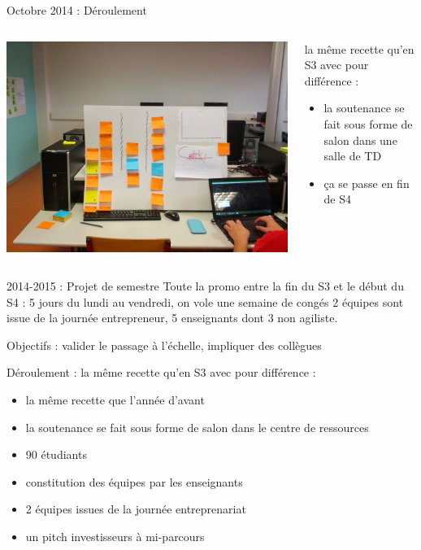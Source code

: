 \documentclass{beamer}
\begin{document}
\begin{frame}{Octobre 2014 : Déroulement }
  \begin{columns}
    \begin{column}{0.5\textwidth}
      \begin{center}
        \includegraphics[width=\textwidth]{includes/2014_S4_dashboard.jpg}      
      \end{center}
    \end{column}
    \begin{column}{0.5\textwidth}
      la même recette qu'en S3 avec pour différence : 
      \begin{itemize}
        \item la soutenance se fait sous forme de salon dans une salle de TD
        \item ça se passe en fin de S4
      \end{itemize}
    \end{column}
  \end{columns}
\end{frame}

\begin{frame}{2014-2015 : Projet de semestre}
  Toute la promo entre la fin du S3 et le début du S4 : 5 jours du lundi au vendredi, on vole une semaine de congés
  2 équipes sont issue de la journée entrepreneur, 5 enseignants dont 3 non agiliste.

  Objectifs : valider le passage à l'échelle, impliquer des collègues

  Déroulement : la même recette qu'en S3 avec pour différence : 
  \begin{itemize}
    \item la même recette que l'année d'avant
    \item la soutenance se fait sous forme de salon dans le centre de ressources
    \item 90 étudiants
    \item constitution des équipes par les enseignants
    \item 2 équipes issues de la journée entreprenariat
    \item un pitch investisseurs à mi-parcours
  \end{itemize}
\end{frame}
\end{document}
